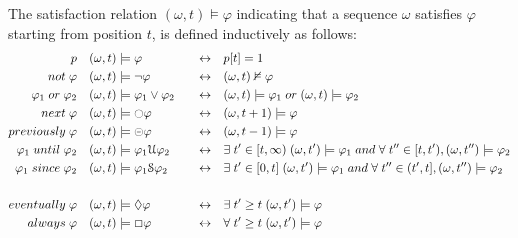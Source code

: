 The satisfaction relation $(\omega, t) \models \varphi$ indicating that a sequence $\omega$ satisfies $\varphi$ starting from position $t$, is defined inductively as follows:
\begin{equation}
\label{form:LTLop}
\begin{aligned}
 p   & & &(\omega, t) \models \varphi & & &\leftrightarrow & & &p[t] = 1 \\
 not \; \varphi & & &(\omega, t) \models \neg \varphi  & & &\leftrightarrow  & & &(\omega, t) \nvDash \varphi \\
 \varphi_1 \; or \; \varphi_2 & & &(\omega, t) \models \varphi_1 \vee \varphi_2  & & &\leftrightarrow  & & &(\omega, t) \models \varphi_1 \; or \; (\omega, t) \models \varphi_2 \\
 next \; \varphi & & &(\omega, t) \models \ocircle \varphi  & & &\leftrightarrow  & & &(\omega, t+1) \models \varphi \\
 previously \; \varphi & & &(\omega, t) \models \circleddash \varphi  & & &\leftrightarrow  & & &(\omega, t-1) \models \varphi \\
 \varphi_1 \; until \; \varphi_2 & & &(\omega, t) \models \varphi_1 \EuScript{U} \varphi_2  & & &\leftrightarrow  & & & \exists \; t^\prime \in [t, \infty) \; (\omega, t^\prime) \models \varphi_1 \; and \; \forall \; t^{\prime \prime} \in [t, t^\prime), (\omega, t^{\prime \prime}) \models \varphi_2\\
 \varphi_1 \; since \; \varphi_2 & & &(\omega, t) \models \varphi_1 \EuScript{S} \varphi_2  & & &\leftrightarrow  & & & \exists \; t^\prime \in [0, t] \; (\omega, t^\prime) \models \varphi_1 \; and \; \forall \; t^{\prime \prime} \in (t^\prime, t], (\omega, t^{\prime\prime}) \models \varphi_2\\
 \\
 eventually \; \varphi & & &(\omega, t) \models \lozenge \varphi  & & &\leftrightarrow  & & & \exists \; t^\prime \ge t \; (\omega, t^\prime) \models \varphi \\
 always \; \varphi & & &(\omega, t) \models \Box \varphi  & & &\leftrightarrow  & & & \forall \; t^\prime \ge t \; (\omega, t^\prime) \models \varphi
\end{aligned}
\end{equation}

